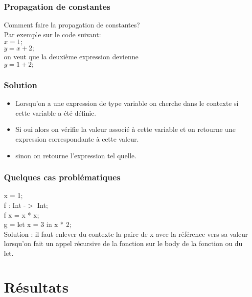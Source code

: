 \documentclass{beamer}
\begin{document}
\begin{frame}
\frametitle{Propagation de constantes}
Comment faire la propagation de constantes?\\
Par exemple sur le code suivant:\\
$x = 1;$\\
\bigskip
$y = x + 2;$\\
\bigskip
on veut que la deuxième expression devienne \\
$y = 1 + 2;$\\

\end{frame}
\begin{frame}
\frametitle{Solution}
    \begin{itemize}
        \item Lorsqu'on a une expression de type variable on cherche dans le contexte si cette variable a été définie.
        \item Si oui alors on vérifie la valeur associé à cette variable et on retourne une expression correspondante à cette valeur.
        \item sinon on retourne l'expression tel quelle.
    \end{itemize}
\end{frame}
\begin{frame}
    \frametitle{Quelques cas problématiques}
    x = 1; \\
    \bigskip
    f : Int -$>$ Int;\\
    f x = x * x;\\
    \bigskip
    g = let x = 3 in x * 2;\\
    \bigskip
    Solution : il faut enlever du contexte la paire de x avec la référence vers sa valeur lorsqu'on fait un appel récursive
    de la fonction sur le body de la fonction ou du let.
\end{frame}
\section{Résultats}
\end{document}
